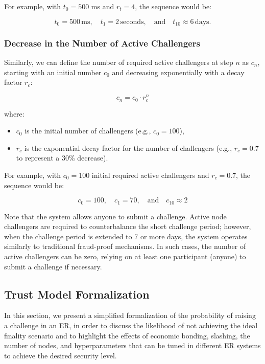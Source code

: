 \documentclass{article}
\begin{document}
For example, with \( t_0 = 500 \) ms and \( r_t = 4 \), the sequence would be:

\[
t_0 = 500 \, \text{ms}, \quad t_1 = 2 \, \text{seconds}, \quad \text{and} \quad t_{10} \approx 6 \, \text{days}.
\]

\subsubsection{Decrease in the Number of Active Challengers}

Similarly, we can define the number of required active challengers at step \( n \) as \( c_n \), starting with an initial number \( c_0 \) and decreasing exponentially with a decay factor \( r_c \):

\[
c_n = c_0 \cdot r_c^n
\]

where:
\begin{itemize}
    \item \( c_0 \) is the initial number of challengers (e.g., \( c_0 = 100 \)),
    \item \( r_c \) is the exponential decay factor for the number of challengers (e.g., \( r_c = 0.7 \) to represent a 30\% decrease).
\end{itemize}

For example, with \( c_0 = 100 \) initial required active challengers and \( r_c = 0.7 \), the sequence would be:

\[
c_0 = 100, \quad c_1 = 70, \quad \text{and} \quad c_{10} \approx 2
\]

Note that the system allows anyone to submit a challenge. Active node challengers are required to counterbalance the short challenge period; however, when the challenge period is extended to 7 or more days, the system operates similarly to traditional fraud-proof mechanisms. In such cases, the number of active challengers can be zero, relying on at least one participant (anyone) to submit a challenge if necessary.

\subsection{Trust Model Formalization}
\label{ss:trust-assumptions}

In this section, we present a simplified formalization of the probability of raising a challenge in an ER, in order to discuss the likelihood of not achieving the ideal finality scenario and to highlight the effects of economic bonding, slashing, the number of nodes, and hyperparameters that can be tuned in different ER systems to achieve the desired security level.
\end{document}
